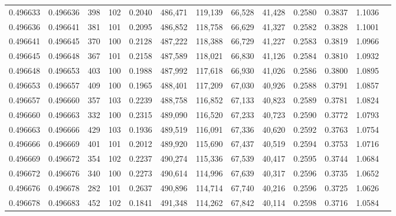 \begin{tabular}{rrrrrrrrrrrrr}
0.496633 & 0.496636 &   398 & 102 &                                     0.2040 & 486,471 & 119,139 &  66,528 &  41,428 & 0.2580 & 0.3837 & 1.1036 \\
0.496636 & 0.496641 &   381 & 101 &                                     0.2095 & 486,852 & 118,758 &  66,629 &  41,327 & 0.2582 & 0.3828 & 1.1001 \\
0.496641 & 0.496645 &   370 & 100 &                                     0.2128 & 487,222 & 118,388 &  66,729 &  41,227 & 0.2583 & 0.3819 & 1.0966 \\
0.496645 & 0.496648 &   367 & 101 &                                     0.2158 & 487,589 & 118,021 &  66,830 &  41,126 & 0.2584 & 0.3810 & 1.0932 \\
0.496648 & 0.496653 &   403 & 100 &                                     0.1988 & 487,992 & 117,618 &  66,930 &  41,026 & 0.2586 & 0.3800 & 1.0895 \\
0.496653 & 0.496657 &   409 & 100 &                                     0.1965 & 488,401 & 117,209 &  67,030 &  40,926 & 0.2588 & 0.3791 & 1.0857 \\
0.496657 & 0.496660 &   357 & 103 &                                     0.2239 & 488,758 & 116,852 &  67,133 &  40,823 & 0.2589 & 0.3781 & 1.0824 \\
0.496660 & 0.496663 &   332 & 100 &                                     0.2315 & 489,090 & 116,520 &  67,233 &  40,723 & 0.2590 & 0.3772 & 1.0793 \\
0.496663 & 0.496666 &   429 & 103 &                                     0.1936 & 489,519 & 116,091 &  67,336 &  40,620 & 0.2592 & 0.3763 & 1.0754 \\
0.496666 & 0.496669 &   401 & 101 &                                     0.2012 & 489,920 & 115,690 &  67,437 &  40,519 & 0.2594 & 0.3753 & 1.0716 \\
0.496669 & 0.496672 &   354 & 102 &                                     0.2237 & 490,274 & 115,336 &  67,539 &  40,417 & 0.2595 & 0.3744 & 1.0684 \\
0.496672 & 0.496676 &   340 & 100 &                                     0.2273 & 490,614 & 114,996 &  67,639 &  40,317 & 0.2596 & 0.3735 & 1.0652 \\
0.496676 & 0.496678 &   282 & 101 &                                     0.2637 & 490,896 & 114,714 &  67,740 &  40,216 & 0.2596 & 0.3725 & 1.0626 \\
0.496678 & 0.496683 &   452 & 102 &                                     0.1841 & 491,348 & 114,262 &  67,842 &  40,114 & 0.2598 & 0.3716 & 1.0584 \\

\end{tabular}
